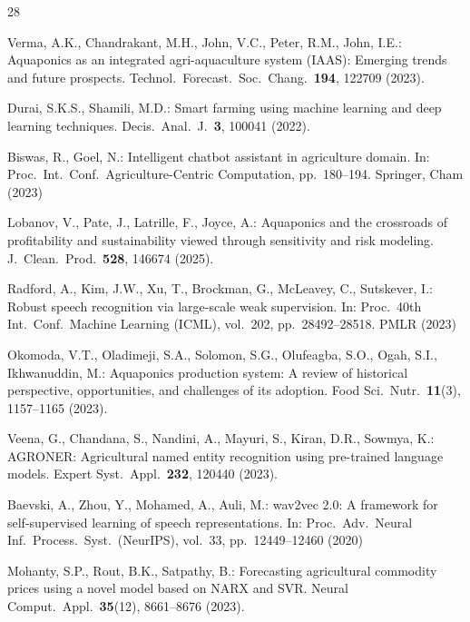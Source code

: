 \documentclass[runningheads]{llncs}
\begin{document}
\begin{thebibliography}{28}

Verma, A.K., Chandrakant, M.H., John, V.C., Peter, R.M., John, I.E.:
Aquaponics as an integrated agri-aquaculture system (IAAS): Emerging
trends and future prospects.
Technol.\ Forecast.\ Soc.\ Chang.\ \textbf{194}, 122709 (2023).

Durai, S.K.S., Shamili, M.D.:
Smart farming using machine learning and deep learning techniques.
Decis.\ Anal.\ J.\ \textbf{3}, 100041 (2022).

Biswas, R., Goel, N.:
Intelligent chatbot assistant in agriculture domain.
In: Proc.\ Int.\ Conf.\ Agriculture-Centric Computation,
pp.\ 180--194. Springer, Cham (2023)

Lobanov, V., Pate, J., Latrille, F., Joyce, A.:
Aquaponics and the crossroads of profitability and sustainability
viewed through sensitivity and risk modeling.
J.\ Clean.\ Prod.\ \textbf{528}, 146674 (2025).

Radford, A., Kim, J.W., Xu, T., Brockman, G., McLeavey, C.,
Sutskever, I.:
Robust speech recognition via large-scale weak supervision.
In: Proc.\ 40th Int.\ Conf.\ Machine Learning (ICML), vol.\ 202,
pp.\ 28492--28518. PMLR (2023)

Okomoda, V.T., Oladimeji, S.A., Solomon, S.G., Olufeagba, S.O.,
Ogah, S.I., Ikhwanuddin, M.:
Aquaponics production system: A review of historical perspective,
opportunities, and challenges of its adoption.
Food Sci.\ Nutr.\ \textbf{11}(3), 1157--1165 (2023).

Veena, G., Chandana, S., Nandini, A., Mayuri, S., Kiran, D.R.,
Sowmya, K.:
AGRONER: Agricultural named entity recognition using pre-trained
language models.
Expert Syst.\ Appl.\ \textbf{232}, 120440 (2023).

Baevski, A., Zhou, Y., Mohamed, A., Auli, M.:
wav2vec 2.0: A framework for self-supervised learning of speech
representations.
In: Proc.\ Adv.\ Neural Inf.\ Process.\ Syst.\ (NeurIPS),
vol.\ 33, pp.\ 12449--12460 (2020)

Mohanty, S.P., Rout, B.K., Satpathy, B.:
Forecasting agricultural commodity prices using a novel model based
on NARX and SVR.
Neural Comput.\ Appl.\ \textbf{35}(12), 8661--8676 (2023).


\end{thebibliography}
\end{document}
